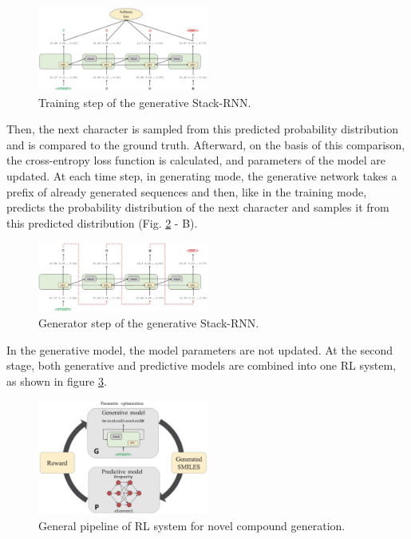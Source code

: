 \documentclass[conference]{IEEEtran}
\begin{document}
\begin{figure}[htbp]
		\centering
			\includegraphics[width=0.50\textwidth]{softmax-loss.png}
		\caption{Training step of the generative Stack-RNN.}
		\label{fig:softmax-loss}
	\end{figure}
	
Then, the next character is sampled from this predicted probability distribution and is compared to the ground truth. Afterward, on the basis of this comparison, the cross-entropy loss function is calculated, and parameters of the model are updated. 
At each time step, in generating mode, the generative network takes a prefix of already generated sequences and then, like in the training mode, predicts the probability distribution of the next character and samples it from this predicted distribution (Fig. \ref{fig:predicted-distribution} - B). 

\begin{figure}[htbp]
		\centering
			\includegraphics[width=0.50\textwidth]{predicted-distribution.png}
		\caption{Generator step of the generative Stack-RNN.}
		\label{fig:predicted-distribution}
	\end{figure}
	
In the generative model, the model parameters are not updated. 
At the second stage, both generative and predictive models are combined into one RL system, as shown in figure \ref{fig:parameter-optimization}. 

\begin{figure}[htbp]
		\centering
			\includegraphics[width=0.50\textwidth]{parameter-optimization.png}
		\caption{General pipeline of RL system for novel compound generation.}
		\label{fig:parameter-optimization}
	\end{figure}
\end{document}
